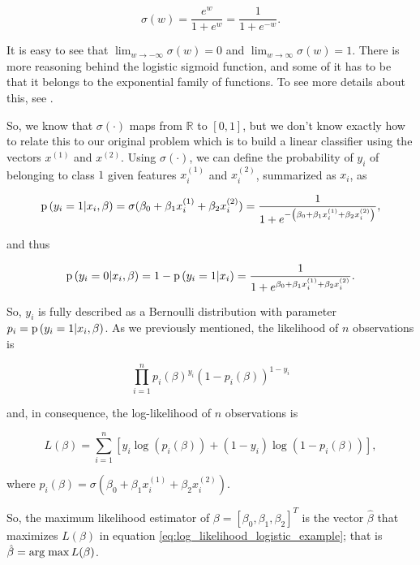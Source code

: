 $$
  \sigma(w) = \frac{e^w}{1 + e^w} = \frac{1}{1 + e^{-w}}.
$$

It is easy to see that $\lim_{w \to -\infty} \sigma(w) = 0$ and $\lim_{w \to \infty} \sigma(w) = 1$. There is more reasoning behind the logistic sigmoid function, and some of it has to be that it belongs to the exponential family of functions. To see more details about this, see \cite{christopher2006pattern}.

So, we know that $\sigma \left( \cdot \right)$ maps from $\mathbb{R}$ to $\left[ 0,1 \right]$, but we don't know exactly how to relate this to our original problem which is to build a linear classifier using the vectors $x^{(1)}$ and $x^{(2)}$. Using  $\sigma \left( \cdot \right)$, we can define the probability of $y_i$ of belonging to class $1$ given features $x_i^{(1)}$ and $x_i^{(2)}$, summarized as $x_i$, as

$$
  \mathrm{p}\left( y_i = 1 | x_i, \beta \right) = \sigma(\beta_0 + \beta_1 x_i^{(1)} + \beta_2 x_i^{(2)}) = \frac{1}{1 + e^{-\left( \beta_0 + \beta_1 x_i^{(1)} + \beta_2 x_i^{(2)} \right)}},
$$

and thus

$$
  \mathrm{p}\left( y_i = 0 | x_i, \beta \right) = 1 - \mathrm{p}\left( y_i = 1 | x_i \right) = \frac{1}{1 + e^{\beta_0 + \beta_1 x_i^{(1)} + \beta_2 x_i^{(2)}}}.
$$

So, $y_i$ is fully described as a Bernoulli distribution with parameter $p_i =\mathrm{p}\left( y_i = 1 | x_i, \beta \right)$. As we previously mentioned, the likelihood of $n$ observations is

$$
  \prod_{i = 1}^n  p_i(\beta)^{y_i}\left(1 - p_i(\beta) \right)^{1 - y_i}
$$

and, in consequence, the log-likelihood of $n$ observations is

\begin{equation}
  \label{eq:log_likelihood_logistic_example}
  L(\beta) = \sum_{i = 1}^n \left[ y_i \log\left( p_i(\beta) \right) + (1 - y_i) \log \left( 1 - p_i(\beta) \right) \right],
\end{equation}

where $p_i(\beta) = \sigma(\beta_0 + \beta_1 x_i^{(1)} + \beta_2 x_i^{(2)})$.

So, the maximum likelihood estimator of $\beta = \left[ \beta_0, \beta_1, \beta_2 \right]^T$ is the vector $\hat{\beta}$ that maximizes $L(\beta)$ in equation \ref{eq:log_likelihood_logistic_example}; that is $\hat{\beta} = \operatorname*{arg\; max} L(\beta)$.



